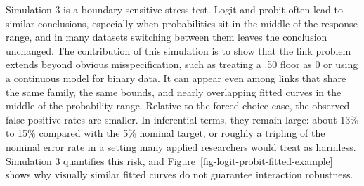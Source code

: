 \documentclass[
  man,
  longtable,
  nolmodern,
  notxfonts,
  notimes,
  colorlinks=true,linkcolor=blue,citecolor=blue,urlcolor=blue]{apa7}
\begin{document}
Simulation 3 is a boundary-sensitive stress test. Logit and probit often
lead to similar conclusions, especially when probabilities sit in the
middle of the response range, and in many datasets switching between
them leaves the conclusion unchanged. The contribution of this
simulation is to show that the link problem extends beyond obvious
misspecification, such as treating a .50 floor as 0 or using a
continuous model for binary data. It can appear even among links that
share the same family, the same bounds, and nearly overlapping fitted
curves in the middle of the probability range. Relative to the
forced-choice case, the observed false-positive rates are smaller. In
inferential terms, they remain large: about 13\% to 15\% compared with
the 5\% nominal target, or roughly a tripling of the nominal error rate
in a setting many applied researchers would treat as harmless.
Simulation 3 quantifies this risk, and
Figure~\ref{fig-logit-probit-fitted-example} shows why visually similar
fitted curves do not guarantee interaction robustness.
\end{document}
